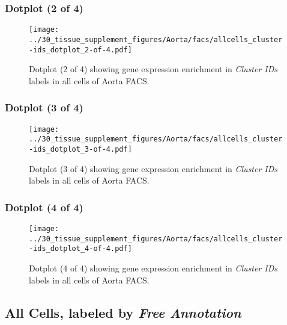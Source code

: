 \clearpage

\subsubsection{Dotplot (2 of 4)}
\begin{figure}[h]
\centering
\texttt{[image: ../30\_tissue\_supplement\_figures/Aorta/facs/allcells\_cluster-ids\_dotplot\_2-of-4.pdf]}

\caption{ Dotplot (2 of 4)  showing gene expression enrichment in \emph{Cluster IDs} labels in all cells of Aorta FACS. }
\end{figure}


\clearpage

\subsubsection{Dotplot (3 of 4)}
\begin{figure}[h]
\centering
\texttt{[image: ../30\_tissue\_supplement\_figures/Aorta/facs/allcells\_cluster-ids\_dotplot\_3-of-4.pdf]}

\caption{ Dotplot (3 of 4)  showing gene expression enrichment in \emph{Cluster IDs} labels in all cells of Aorta FACS. }
\end{figure}


\clearpage

\subsubsection{Dotplot (4 of 4)}
\begin{figure}[h]
\centering
\texttt{[image: ../30\_tissue\_supplement\_figures/Aorta/facs/allcells\_cluster-ids\_dotplot\_4-of-4.pdf]}

\caption{ Dotplot (4 of 4)  showing gene expression enrichment in \emph{Cluster IDs} labels in all cells of Aorta FACS. }
\end{figure}


\clearpage

\subsection{All Cells, labeled by \emph{Free Annotation}}
